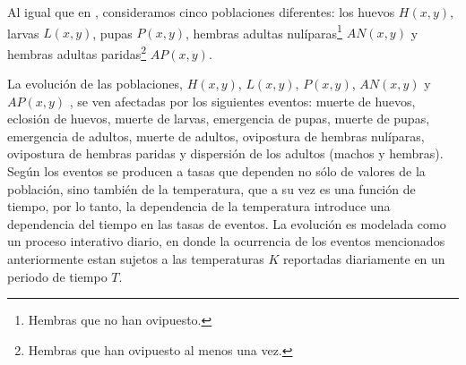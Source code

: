 Al igual que en \citet{otero2006stochastic}, consideramos cinco poblaciones diferentes:
los huevos $H(x,y)$, larvas $L(x,y)$, pupas $P(x,y)$, hembras adultas nulíparas\footnote{Hembras
que no han ovipuesto.} $AN(x,y)$ y hembras adultas paridas\footnote{Hembras que han ovipuesto al
menos una vez.} $AP(x,y)$.

La evolución de las poblaciones, $H(x,y)$, $L(x,y)$, $P(x,y)$, $AN(x,y)$ y $AP(x,y)$ , se ven
afectadas por los siguientes eventos: muerte de huevos, eclosión de huevos, muerte de larvas,
emergencia de pupas, muerte de pupas, emergencia de adultos, muerte de adultos, ovipostura de
hembras nulíparas, ovipostura de hembras paridas y dispersión de los adultos (machos y hembras).
Según \citet{otero2006stochastic} los eventos se producen a tasas que dependen no sólo de valores
de la población, sino también de la temperatura, que a su vez es una función de tiempo, por lo
tanto, la dependencia de la temperatura introduce una dependencia del tiempo en las tasas de
eventos. La evolución es modelada como un proceso interativo diario, en donde la ocurrencia de los
eventos mencionados anteriormente estan sujetos a las temperaturas $K$ reportadas diariamente en
un periodo de tiempo $T$.












